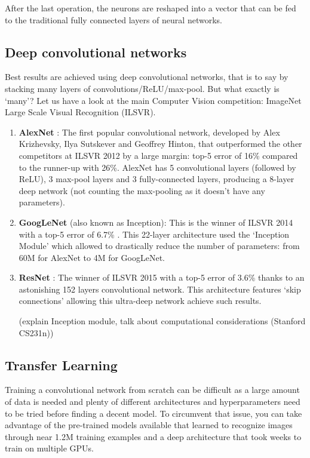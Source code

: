 After the last operation, the neurons are reshaped into a vector that can be fed to the traditional fully connected layers of neural networks.

\subsection{Deep convolutional networks}
Best results are achieved using deep convolutional networks, that is to say by stacking many layers of convolutions/ReLU/max-pool. But what exactly is `many'? Let us have a look at the main Computer Vision competition: ImageNet Large Scale Visual Recognition (ILSVR).
\begin{enumerate}
    \item \textbf{AlexNet} \cite{alexnet}: The first popular convolutional network, developed by Alex Krizhevsky, Ilya Sutskever and Geoffrey Hinton, that outperformed 
    the other competitors at ILSVR 2012 by a large margin: top-5 error of 16\% compared to the runner-up with 26\%. AlexNet has 5 convolutional layers (followed by 
    ReLU), 3 max-pool layers and 3 fully-connected layers, producing a 8-layer deep network (not counting the max-pooling as it doesn't have any parameters).
    \item \textbf{GoogLeNet} (also known as Inception)\cite{googlenet}: This is the winner of ILSVR 2014 with a top-5 error of 6.7\% . This 22-layer architecture used 
    the `Inception Module' which allowed to drastically reduce the number of parameters: from 60M for AlexNet to 4M for GoogLeNet.
    \item \textbf{ResNet} \cite{resnet}: The winner of ILSVR 2015 with a top-5 error of 3.6\% thanks to an astonishing 152 layers convolutional network. This 
    architecture features `skip connections' allowing this ultra-deep network achieve such results.

(explain Inception module, talk about computational considerations (Stanford CS231n))
\end{enumerate}

\subsection{Transfer Learning}
Training a convolutional network from scratch can be difficult as a large amount of data is needed and plenty of different architectures and hyperparameters need to be tried before finding a decent model. To circumvent that issue, you can take advantage of the pre-trained models available that learned to recognize images through near 1.2M training examples and a deep architecture that took weeks to train on multiple GPUs.

